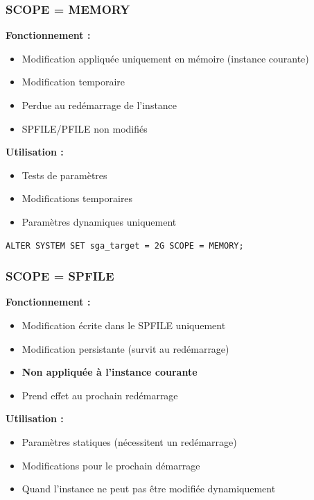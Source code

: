 \documentclass[11pt,a4paper]{article}
\begin{document}
\subsubsection{SCOPE = MEMORY}

\textbf{Fonctionnement :}
\begin{itemize}
    \item Modification appliquée uniquement en mémoire (instance courante)
    \item Modification temporaire
    \item Perdue au redémarrage de l'instance
    \item SPFILE/PFILE non modifiés
\end{itemize}

\textbf{Utilisation :}
\begin{itemize}
    \item Tests de paramètres
    \item Modifications temporaires
    \item Paramètres dynamiques uniquement
\end{itemize}

\begin{commandebox}
\begin{lstlisting}
ALTER SYSTEM SET sga_target = 2G SCOPE = MEMORY;
\end{lstlisting}
\end{commandebox}

\subsubsection{SCOPE = SPFILE}

\textbf{Fonctionnement :}
\begin{itemize}
    \item Modification écrite dans le SPFILE uniquement
    \item Modification persistante (survit au redémarrage)
    \item \textbf{Non appliquée à l'instance courante}
    \item Prend effet au prochain redémarrage
\end{itemize}

\textbf{Utilisation :}
\begin{itemize}
    \item Paramètres statiques (nécessitent un redémarrage)
    \item Modifications pour le prochain démarrage
    \item Quand l'instance ne peut pas être modifiée dynamiquement
\end{itemize}
\end{document}
